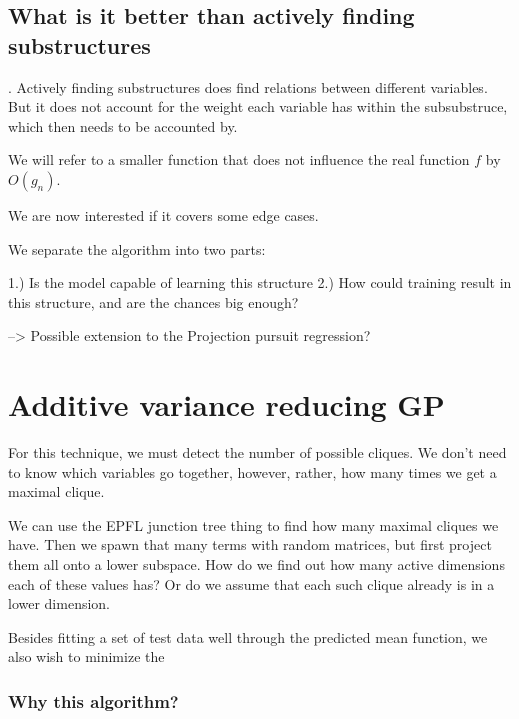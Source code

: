 \subsection{What is it better than actively finding substructures}.
Actively finding substructures does find relations between different variables.
But it does not account for the weight each variable has within the subsubstruce, which then needs to be accounted by.

We will refer to a smaller function that does not influence the real function $f$ by $O(g_n)$.

We are now interested if it covers some edge cases.

We separate the algorithm into two parts:

1.) Is the model capable of learning this structure
2.) How could training result in this structure, and are the chances big enough?

--> Possible extension to the Projection pursuit regression?

\section{Additive variance reducing GP}
For this technique, we must detect the number of possible cliques.
We don't need to know which variables go together, however, rather, how many times we get a maximal clique.

We can use the EPFL junction tree thing to find how many maximal cliques we have. 
Then we spawn that many terms with random matrices, but first project them all onto a lower subspace.
How do we find out how many active dimensions each of these values has?
Or do we assume that each such clique already is in a lower dimension.


Besides fitting a set of test data well through the predicted mean function, we also wish to minimize the 

\subsubsection{Why this algorithm?}


